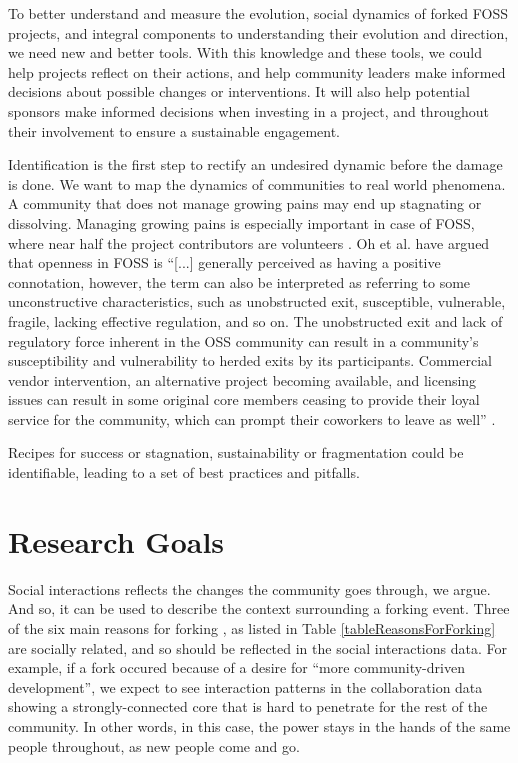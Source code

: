 \documentclass{acm_proc_article-sp}
\begin{document}
To better understand and measure the evolution, social dynamics of forked FOSS projects, and integral components to understanding their evolution and direction, we need new and better tools. With this knowledge and these tools, we could help projects reflect on their actions, and help community leaders make informed decisions about possible changes or interventions. It will also help potential sponsors make informed decisions when investing in a project, and throughout their involvement to ensure a sustainable engagement. 

Identification is the first step to rectify an undesired dynamic before the damage is done. We want to map the dynamics of communities to real world phenomena. A community that does not manage growing pains may end up stagnating or dissolving. Managing growing pains is especially important in case of FOSS, where near half the project contributors are volunteers \cite{Forrest}. Oh et al. \cite{Oh} have argued that openness in FOSS is ``[...] generally perceived as having a positive connotation, however, the term can also be interpreted as referring to some unconstructive characteristics, such as unobstructed exit, susceptible, vulnerable, fragile, lacking effective regulation, and so on. The unobstructed exit and lack of regulatory force inherent in the OSS community can result in a community's susceptibility and vulnerability to herded exits by its participants. Commercial vendor intervention, an alternative project becoming available, and licensing issues can result in some original core members ceasing to provide their loyal service for the community, which can prompt their coworkers to leave as well'' \cite{Oh}.

Recipes for success or stagnation, sustainability or fragmentation could be identifiable, leading to a set of best practices and pitfalls.

\section{Research Goals}
\label{ResearchGoalsAndMethods}

Social interactions reflects the changes the community goes through, we argue. And so, it can be used to describe the context surrounding a forking event. Three of the six main reasons for forking \cite{Robles}, as listed in Table \ref{tableReasonsForForking} are socially related, and so should be reflected in the social interactions data. For example, if a fork occured because of a desire for ``more community-driven development'', we expect to see interaction patterns in the collaboration data showing a strongly-connected core that is hard to penetrate for the rest of the community. In other words, in this case, the power stays in the hands of the same people throughout, as new people come and go. 
\end{document}

